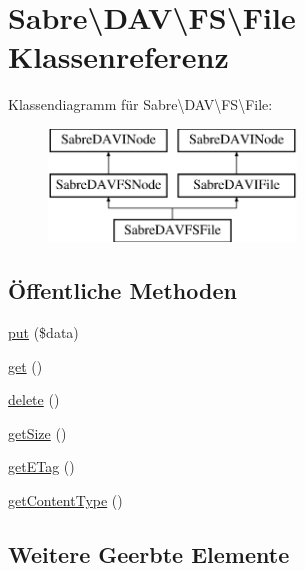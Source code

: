 \hypertarget{class_sabre_1_1_d_a_v_1_1_f_s_1_1_file}{}\section{Sabre\textbackslash{}D\+AV\textbackslash{}FS\textbackslash{}File Klassenreferenz}
\label{class_sabre_1_1_d_a_v_1_1_f_s_1_1_file}
Klassendiagramm für Sabre\textbackslash{}D\+AV\textbackslash{}FS\textbackslash{}File\+:\begin{figure}[H]
\begin{center}
\leavevmode
\includegraphics[height=3.000000cm]{class_sabre_1_1_d_a_v_1_1_f_s_1_1_file}
\end{center}
\end{figure}
\subsection*{Öffentliche Methoden}
\begin{DoxyCompactItemize}
\item 
\mbox{\hyperlink{class_sabre_1_1_d_a_v_1_1_f_s_1_1_file_adad097762986bc953af13c17fdae517c}{put}} (\$data)
\item 
\mbox{\hyperlink{class_sabre_1_1_d_a_v_1_1_f_s_1_1_file_aee10f79224dfccf81bf9ca61e3cfba43}{get}} ()
\item 
\mbox{\hyperlink{class_sabre_1_1_d_a_v_1_1_f_s_1_1_file_a87df46fb2d0d38657b31d7ff00c3a519}{delete}} ()
\item 
\mbox{\hyperlink{class_sabre_1_1_d_a_v_1_1_f_s_1_1_file_a5c081df437f59b33c8402123ceb45439}{get\+Size}} ()
\item 
\mbox{\hyperlink{class_sabre_1_1_d_a_v_1_1_f_s_1_1_file_a133fec88700f329ed4aa9a7e6c1fd5cd}{get\+E\+Tag}} ()
\item 
\mbox{\hyperlink{class_sabre_1_1_d_a_v_1_1_f_s_1_1_file_aca06c255562df9fc5b200760d29424d2}{get\+Content\+Type}} ()
\end{DoxyCompactItemize}
\subsection*{Weitere Geerbte Elemente}


